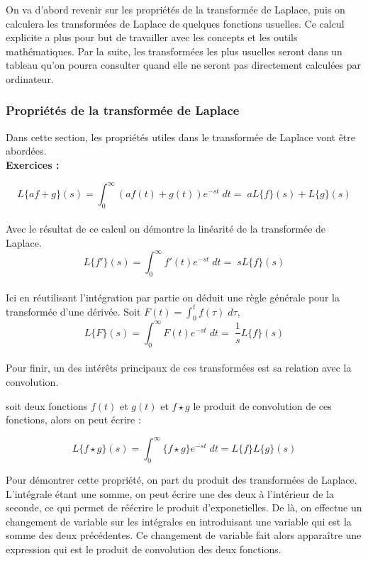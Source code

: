 \documentclass[11pt,a4paper]{article}
\begin{document}
On va d'abord revenir sur les propriétés de la transformée de Laplace, puis on calculera les transformées de Laplace de quelques fonctions usuelles. Ce calcul explicite a plus pour but de travailler avec les concepts et les outils mathématiques. Par la suite, les transformées les plus usuelles seront dans un tableau qu'on pourra consulter quand elle ne seront pas directement calculées par  ordinateur.\\

\subsubsection{Propriétés de la transformée de Laplace}
Dans cette section, les propriétés utiles dans le transformée de Laplace vont être abordées.\\

\textbf{Exercices : } 

\[L\{af+g\}(s) = \int^{\infty}_{0}( a f(t) + g(t)) e^{-st} \; dt = \; a L\{ f\}(s) + L \{ g \} (s) \]\\

Avec le résultat de ce calcul on démontre la linéarité de la transformée de Laplace.\\

\[L\{f'\}(s) = \int^{\infty}_{0}f'(t) e^{-st} \; dt = \; s L\{f \}(s)\]\\

Ici en réutilisant l'intégration par partie on déduit une règle générale pour la transformée d'une dérivée. Soit $F(t) = \int^{t}_{0} f(\tau)  \; d\tau$,\\

\[L\{F\}(s) = \int^{\infty}_{0}F(t) e^{-st} \; dt = \; \frac{1}{s} L\{f \}(s)\]\\

Pour finir, un des intérêts principaux de ces transformées est sa relation avec la convolution.

soit deux fonctions $f(t)$ et $g(t)$ et $f \star g$ le produit de convolution de ces fonctions, alors on peut écrire :

\[L \{f \star g\} (s) =  \int^{\infty}_{0}\{f \star g\} e^{-st} \; dt = L\{f\}L\{g\} (s)  \]

Pour démontrer cette propriété, on part du produit des transformées de Laplace. L'intégrale étant une somme, on peut écrire une des deux à l'intérieur de la seconde, ce qui permet de réécrire le produit d'exponetielles. De là, on effectue un changement de variable sur les intégrales en introduisant une variable qui est la somme des deux précédentes. Ce changement de variable fait alors apparaître une expression qui est le produit de convolution des deux fonctions.
\end{document}
